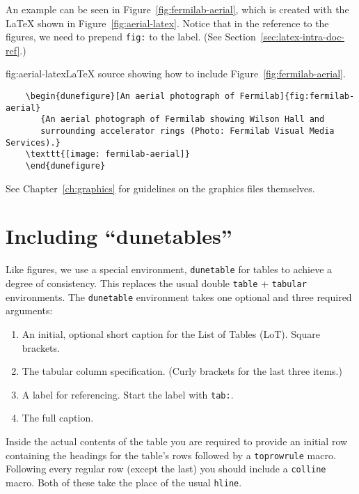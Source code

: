 An example can be seen in Figure~\ref{fig:fermilab-aerial}, which is created
with the \LaTeX{} shown in Figure~\ref{fig:aerial-latex}.  Notice that in the reference to the figures, we need to prepend \texttt{fig:} to the label. (See Section~\ref{sec:latex-intra-doc-ref}.)

\begin{dunefigure}{fig:aerial-latex}{\LaTeX{} source showing how to include Figure~\ref{fig:fermilab-aerial}.}
\begin{verbatim}
    \begin{dunefigure}[An aerial photograph of Fermilab]{fig:fermilab-aerial}
       {An aerial photograph of Fermilab showing Wilson Hall and 
       surrounding accelerator rings (Photo: Fermilab Visual Media Services).}
    \texttt{[image: fermilab-aerial]}
    \end{dunefigure}
\end{verbatim}
\end{dunefigure}

See Chapter~\ref{ch:graphics} for guidelines on the graphics files themselves.

\FloatBarrier

\section{Including ``dunetables''}
\label{sec:latex-tables}

Like figures, we use a special environment, \texttt{dunetable} for
tables to achieve a degree of consistency.
This replaces the usual double \texttt{table} + \texttt{tabular} environments.
The \texttt{dunetable} environment takes one optional and three
required arguments:

\begin{enumerate}
\item An initial, optional short caption for the List of Tables (LoT). Square brackets.
\item The tabular column specification. (Curly brackets for the last three items.)
\item A label for referencing. Start the label with \texttt{tab:}. 
\item The full caption.
\end{enumerate}

Inside the actual contents of the table you are required to provide an
initial row containing the headings for the table's rows followed by a
\texttt{toprowrule} macro.
Following every regular row (except the last) you should include a
\texttt{colline} macro.
Both of these take the place of the usual \texttt{hline}.

